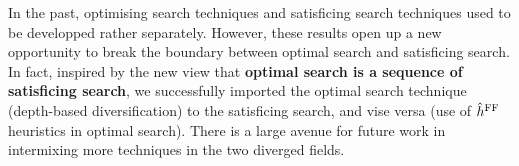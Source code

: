 In the past, optimising search
techniques and satisficing search
techniques used to be
developped rather separately. However,
these results open up a new opportunity to break the boundary between
optimal search and satisficing search. In fact, inspired by the new
view that \textbf{optimal search is a sequence of satisficing
search}, we successfully imported the optimal search technique
(depth-based diversification) to the satisficing search, and vise versa
(use of $\hat{h}^{\text{FF}}$ heuristics in optimal search).
There is a large avenue for future work in 
intermixing more techniques in the two diverged fields.
